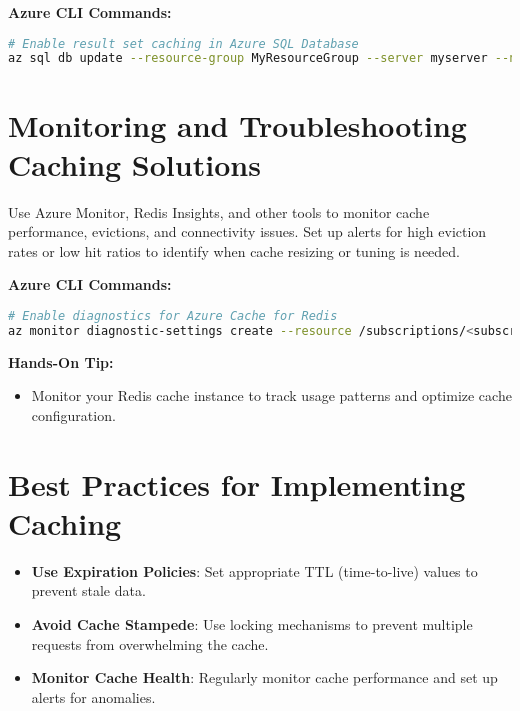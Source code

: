 \documentclass{article}
\begin{document}
\textbf{Azure CLI Commands:}
\begin{lstlisting}[language=bash]
# Enable result set caching in Azure SQL Database
az sql db update --resource-group MyResourceGroup --server myserver --name mydatabase --set queryStoreResultsCache=true
\end{lstlisting}

\section{Monitoring and Troubleshooting Caching Solutions}
Use Azure Monitor, Redis Insights, and other tools to monitor cache performance, evictions, and connectivity issues. Set up alerts for high eviction rates or low hit ratios to identify when cache resizing or tuning is needed.

\textbf{Azure CLI Commands:}
\begin{lstlisting}[language=bash]
# Enable diagnostics for Azure Cache for Redis
az monitor diagnostic-settings create --resource /subscriptions/<subscription-id>/resourceGroups/MyResourceGroup/providers/Microsoft.Cache/Redis/MyRedisCache --name MyDiagnostics --logs '[{"category": "RedisCacheAccess","enabled": true}]'
\end{lstlisting}

\textbf{Hands-On Tip:}
\begin{itemize}
    \item Monitor your Redis cache instance to track usage patterns and optimize cache configuration.
\end{itemize}

\section{Best Practices for Implementing Caching}
\begin{itemize}
    \item \textbf{Use Expiration Policies}: Set appropriate TTL (time-to-live) values to prevent stale data.
    \item \textbf{Avoid Cache Stampede}: Use locking mechanisms to prevent multiple requests from overwhelming the cache.
    \item \textbf{Monitor Cache Health}: Regularly monitor cache performance and set up alerts for anomalies.
\end{itemize}
\end{document}
